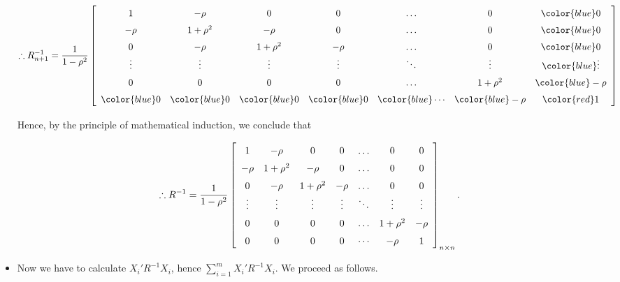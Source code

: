 \documentclass[11pt, a4paper]{article}
\begin{document}
\begin{itemize}
\begin{align*}
\therefore R_{n+1}^{-1} =
{
\renewcommand{\arraystretch}{1.5}
\dfrac{1}{1 - \rho^2}
\left[
\begin{array}{ccccccc}
1 & -\rho & 0 & 0 & \ldots & 0 & {\color{blue} 0} \\
-\rho & 1+\rho^2 & -\rho & 0 & \ldots & 0 & {\color{blue} 0} \\
0 & -\rho & 1+\rho^2 & -\rho & \ldots & 0 & {\color{blue} 0} \\
\vdots & \vdots & \vdots & \vdots & \ddots & \vdots & {\color{blue} \vdots} \\
0 & 0 & 0 & 0 & \ldots & 1+\rho^2 & {\color{blue} -\rho} \\
{\color{blue} 0} & {\color{blue} 0} & {\color{blue} 0} & {\color{blue} 0} & {\color{blue} \cdots} & {\color{blue} -\rho} & {\color{red} 1}
\end{array}
\right]
}
\end{align*}

Hence, by the principle of mathematical induction, we conclude that

\begin{align*}
\therefore R^{-1} =
{
\renewcommand{\arraystretch}{1.5}
\dfrac{1}{1 - \rho^2}
\left[
\begin{array}{ccccccc}
1 & -\rho & 0 & 0 & \ldots & 0 & 0 \\
-\rho & 1+\rho^2 & -\rho & 0 & \ldots & 0 & 0 \\
0 & -\rho & 1+\rho^2 & -\rho & \ldots & 0 & 0 \\
\vdots & \vdots & \vdots & \vdots & \ddots & \vdots & \vdots \\
0 & 0 & 0 & 0 & \ldots & 1+\rho^2 & -\rho \\
0 & 0 & 0 & 0 & \cdots & -\rho & 1
\end{array}
\right]_{n \times n}.
}
\end{align*}


\newpage


\item[\scalebox{2.0}{\twemoji{keycap: 2}}] \hspace{0.2cm} Now we have to calculate $X_i'R^{-1}X_i$, hence $\sum \limits_{i = 1}^{m} X_i'R^{-1}X_i$. We proceed as follows.


\end{itemize}
\end{document}
